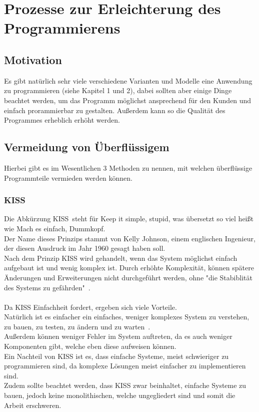 \documentclass[a4paper, 10pt]{scrartcl}
\begin{document}
\section{Prozesse zur Erleichterung des Programmierens} \label{Erleichterung}
\subsection{Motivation}
Es gibt natürlich sehr viele verschiedene Varianten und Modelle eine Anwendung zu programmieren (siehe Kapitel 1 und 2), dabei sollten aber einige Dinge beachtet werden, um das Programm möglichst ansprechend für den Kunden und einfach prorammierbar zu gestalten. Außerdem kann so die Qualität des Programmes erheblich erhöht werden. 
\subsection{Vermeidung von Überflüssigem}
Hierbei gibt es im Wesentlichen 3 Methoden zu nennen, mit welchen überflüssige Programmteile vermieden werden können.


\subsubsection{KISS}
Die Abkürzung \glqq KISS\grqq \ steht für \glqq Keep it simple, stupid\grqq, was übersetzt so viel heißt wie \glqq Mach es einfach, Dummkopf\grqq. \\
Der Name dieses Prinzips stammt von Kelly Johnson, einem englischen Ingenieur, der diesen Ausdruck im Jahr 1960 gesagt haben soll. \citep {goll_entwurfsprinzipien}  \\
Nach dem Prinzip KISS wird gehandelt, wenn das System möglichst einfach aufgebaut ist und wenig komplex ist. Durch erhöhte Komplexität, können spätere Änderungen und Erweiterungen nicht durchgeführt werden, ohne "die Stabiblität des Systems zu gefährden"\  \cite{goll_entwurfsprinzipien}.\\\\
Da KISS Einfachheit fordert, ergeben sich viele Vorteile. \\
Natürlich ist es einfacher ein einfaches, weniger komplexes System  \glqq zu verstehen, zu bauen, zu testen, zu ändern und zu warten\grqq\ \cite{goll_entwurfsprinzipien}.\\
Außerdem können weniger Fehler im System auftreten, da es auch weniger Komponenten gibt, welche eben diese aufweisen können.\\
Ein Nachteil von KISS ist es, dass einfache Systeme, meist schwieriger zu programmieren sind, da komplexe Lösungen meist einfacher zu implementieren sind.\\
Zudem sollte beachtet werden, dass KISS zwar beinhaltet, einfache Systeme zu bauen, jedoch keine monolithischen, welche ungegliedert sind und somit die Arbeit erschweren. \citep{goll_entwurfsprinzipien}
\end{document}
